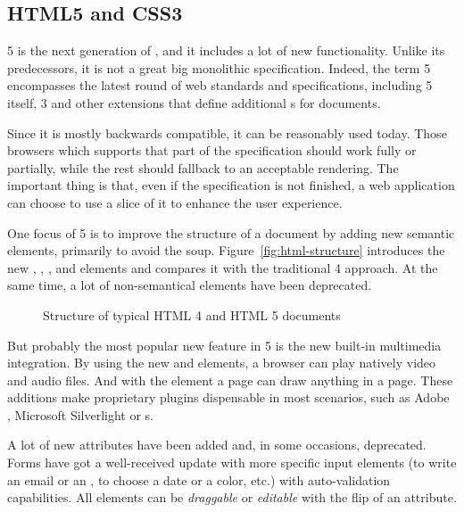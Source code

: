 \subsection{HTML5 and CSS3} %
\label{sub:html5css3}

 5 is the next generation of , and it includes a lot of new functionality\cite{HTML5NEW}.
Unlike its predecessors, it is not a great big monolithic specification.
Indeed, the term  5 encompasses the latest round of web standards and specifications, including  5 itself,  3 and other extensions that define additional s for  documents.

Since it is mostly backwards compatible, it can be reasonably used today.
Those browsers which supports that part of the specification should work fully or partially, while the rest should fallback to an acceptable rendering.
The important thing is that, even if the specification is not finished, a web application can choose to use a slice of it to enhance the user experience.

One focus of  5 is to improve the structure of a document by adding new semantic elements, primarily to avoid the  soup.
Figure~\vref{fig:html-structure} introduces the new , , ,  and  elements and compares it with the traditional  4 approach.
At the same time, a lot of non-semantical elements have been deprecated.

\begin{figure}[htbp]
  \centering
  \caption{Structure of typical HTML 4 and HTML 5 documents}
  \label{fig:html-structure}
\end{figure}

But probably the most popular new feature in  5 is the new built-in multimedia integration.
By using the new  and  elements, a browser can play natively video and audio files.
And with the  element a page can draw anything in a page.
These additions make proprietary plugins dispensable in most scenarios, such as Adobe , Microsoft Silverlight or s.

A lot of new attributes have been added and, in some occasions, deprecated.
Forms have got a well-received update with more specific input elements (to write an email or an , to choose a date or a color, etc.) with auto-validation capabilities.
All elements can be \emph{draggable} or \emph{editable} with the flip of an attribute.

